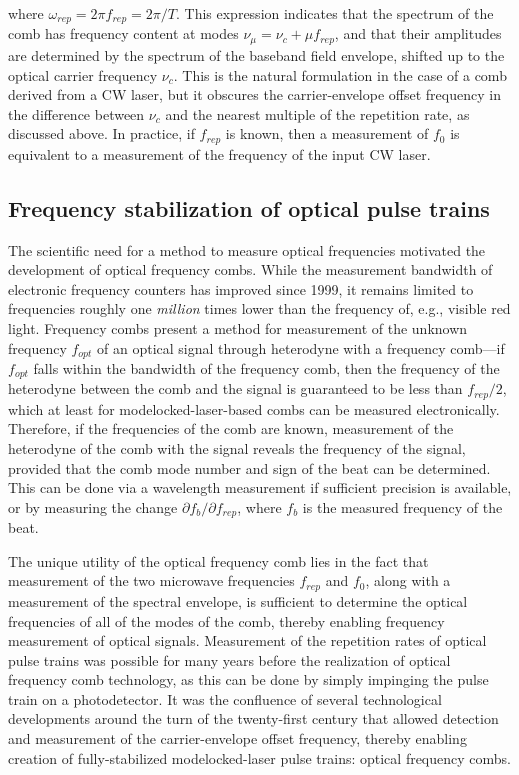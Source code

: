 where $\omega_{rep}=2\pi f_{rep}=2\pi/T$. This expression indicates that the spectrum of the comb has frequency content at modes $\nu_\mu=\nu_c+\mu f_{rep}$, and that their amplitudes are determined by the spectrum of the baseband field envelope, shifted up to the optical carrier frequency $\nu_c$. This is the natural formulation in the case of a comb derived from a CW laser, but it obscures the carrier-envelope offset frequency in the difference between $\nu_c$ and the nearest multiple of the repetition rate, as discussed above. In practice, if $f_{rep}$ is known, then a measurement of $f_0$ is equivalent to a measurement of the frequency of the input CW laser.


\subsection{Frequency stabilization of optical pulse trains}

The scientific need for a method to measure optical frequencies motivated the development of optical frequency combs. While the measurement bandwidth of electronic frequency counters has improved since 1999, it remains limited to frequencies roughly one \textit{million} times lower than the frequency of, e.g., visible red light. Frequency combs present a method for measurement of the unknown frequency $f_{opt}$ of an optical signal through heterodyne with a frequency comb---if $f_{opt}$ falls within the bandwidth of the frequency comb, then the frequency of the heterodyne between the comb and the signal is guaranteed to be less than $f_{rep}/2$, which at least for modelocked-laser-based combs can be measured electronically. Therefore, if the frequencies of the comb are known, measurement of the heterodyne of the comb with the signal reveals the frequency of the signal, provided that the comb mode number and sign of the beat can be determined. This can be done via a wavelength measurement if sufficient precision is available, or by measuring the change $\partial f_b/\partial f_{rep}$, where $f_b$ is the measured frequency of the beat.

The unique utility of the optical frequency comb lies in the fact that measurement of the two microwave frequencies $f_{rep}$ and $f_0$, along with a measurement of the spectral envelope, is sufficient to determine the optical frequencies of all of the modes of the comb, thereby enabling frequency measurement of optical signals. Measurement of the repetition rates of optical pulse trains was possible for many years before the realization of optical frequency comb technology, as this can be done by simply impinging the pulse train on a photodetector. It was the confluence of several technological developments around the turn of the twenty-first century that allowed detection and measurement of the carrier-envelope offset frequency, thereby enabling creation of fully-stabilized modelocked-laser pulse trains: optical frequency combs.

